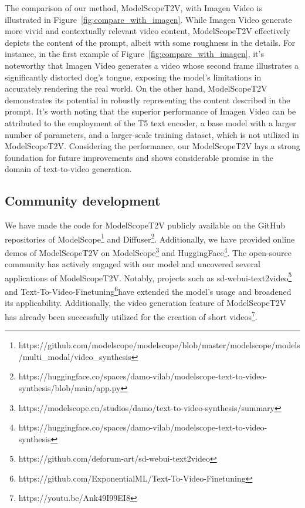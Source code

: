 The comparison of our method, ModelScopeT2V, with Imagen Video is illustrated in Figure~\ref{fig:compare_with_imagen}.
While Imagen Video generate more vivid and contextually relevant video content, ModelScopeT2V effectively depicts the content of the prompt, albeit with some roughness in the details.
For instance, in the first example of Figure~\ref{fig:compare_with_imagen}, it's noteworthy that Imagen Video generates a video whose second frame illustrates a significantly distorted dog's tongue, exposing the model's limitations in accurately rendering the real world.
On the other hand, ModelScopeT2V demonstrates its potential in robustly representing the content described in the prompt.
It's worth noting that the superior performance of Imagen Video can be attributed to the employment of the T5 text encoder, a base model with a larger number of parameters, and a larger-scale training dataset, which is not utilized in ModelScopeT2V.
Considering the performance, our  ModelScopeT2V lays a strong foundation for future improvements and shows considerable promise in the domain of text-to-video generation.




\subsection{Community development} 

We have made the code for ModelScopeT2V publicly available on the GitHub repositories of ModelScope\footnote{https://github.com/modelscope/modelscope/blob/master/modelscope/models/multi\_modal/video\_synthesis} and Diffuser\footnote{https://huggingface.co/spaces/damo-vilab/modelscope-text-to-video-synthesis/blob/main/app.py}.
Additionally, we have provided online demos of ModelScopeT2V on ModelScope\footnote{https://modelscope.cn/studios/damo/text-to-video-synthesis/summary} and HuggingFace\footnote{ https://huggingface.co/spaces/damo-vilab/modelscope-text-to-video-synthesis}. 
The open-source community has actively engaged with our model and uncovered several applications of ModelScopeT2V.
Notably, projects such as sd-webui-text2video\footnote{https://github.com/deforum-art/sd-webui-text2video} and Text-To-Video-Finetuning\footnote{https://github.com/ExponentialML/Text-To-Video-Finetuning}have extended the model's usage and broadened its applicability.
Additionally, the video generation feature of ModelScopeT2V has already been successfully utilized for the creation of short videos\footnote{https://youtu.be/Ank49I99EI8}.

